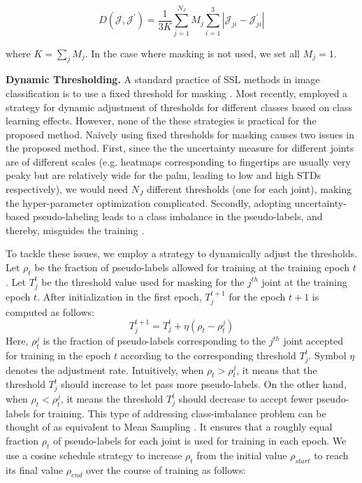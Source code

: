\documentclass{article}
\begin{document}
\begin{equation}
  D(\mathcal{J},\mathcal{J}^{\prime}) = \frac{1}{3K}\sum\limits_{j=1}^{N_J}{M_j \sum\limits_{i=1}^{3}{|\mathcal{J}_{ji} - \mathcal{J}^{\prime}_{ji}|}}
\end{equation}

where $K = \sum_j{M_j}$. In the case where masking is not used, we set all $M_j = 1$.
\par

\textbf{Dynamic Thresholding.} A standard practice of SSL methods in image classification is to use a fixed threshold for masking \cite{sohn2020fixmatch,xie2019unsupervised}. Most recently, \cite{zhang2021flexmatch} employed a strategy for dynamic adjustment of thresholds for different classes based on class learning effects. However, none of the these strategies is practical for the proposed method. Naively using fixed thresholds for masking causes two issues in the proposed method. First, since the the uncertainty measure for different joints are of different scales (e.g. heatmaps corresponding to fingertips are usually very peaky but are relatively wide for the palm, leading to low and high STDs respectively), we would need $N_J$ different thresholds (one for each joint), making the hyper-parameter optimization complicated. Secondly, adopting uncertainty-based pseudo-labeling leads to a class imbalance in the pseudo-labels, and thereby, misguides the training \cite{nassar2021all}. \par
To tackle these issues, we employ a strategy to dynamically adjust the thresholds. Let ${\rho}_t$ be the fraction of pseudo-labels allowed for training at the training epoch $t$. Let $T^t_j$ be the threshold value used for masking for the $j^{th}$ joint at the training epoch $t$. After initialization in the first epoch, $T^{t+1}_j$  for the epoch $t+1$ is computed as follows:
\begin{equation}
\label{eqn:dynamicthreshold}
  T^{t+1}_j = T^t_j + \eta({\rho}_t - {\rho^j_t} )
\end{equation}
Here, ${\rho^j_t}$ is the fraction of pseudo-labels corresponding to the $j^{th}$ joint accepted for training in the epoch $t$ according to the corresponding threshold $T^t_j$. Symbol $\eta$ denotes the adjustment rate. Intuitively, when ${\rho}_t > {\rho^j_t}$, it means that the threshold $T^t_j$ should increase to let pass more pseudo-labels. On the other hand, when ${\rho}_t < {\rho^j_t}$, it means the threshold $T^t_j$ should decrease to accept fewer pseudo-labels for training. This type of addressing class-imbalance problem can be thought of as equivalent to Mean Sampling \cite{he2021rethinking}. It ensures that a roughly equal fraction ${\rho_t}$ of pseudo-labels for each joint is used for training in each epoch. We use a cosine schedule strategy \cite{loshchilov2016sgdr} to increase  ${\rho}_t$ from the initial value ${\rho}_{start}$ to reach  its final value ${\rho}_{end}$ over the course of training as follows:
\end{document}
